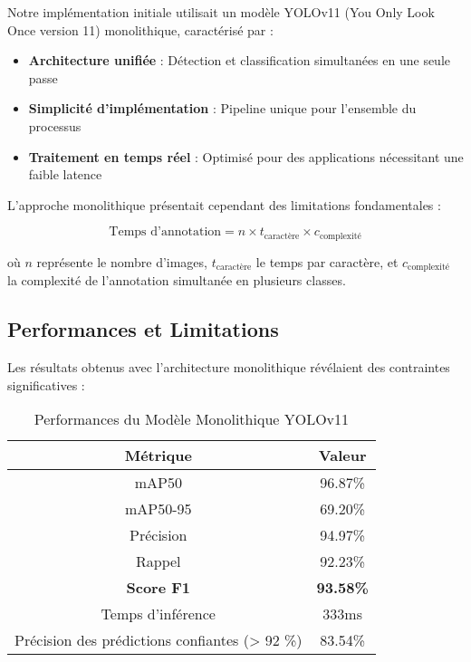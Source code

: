 \documentclass[letterpaper, 10 pt, conference]{ieeeconf}  %
\begin{document}
Notre implémentation initiale utilisait un modèle YOLOv11
(You Only Look Once version 11) monolithique, caractérisé par :

\begin{itemize}
\item \textbf{Architecture unifiée} : Détection et classification simultanées en une seule passe
\item \textbf{Simplicité d'implémentation} : Pipeline unique pour l'ensemble du processus
\item \textbf{Traitement en temps réel} : Optimisé pour des applications nécessitant une faible latence
\end{itemize}

L'approche monolithique présentait cependant des limitations fondamentales :

\begin{equation}
\text{Temps d'annotation} = n \times t_{\text{caractère}} \times c_{\text{complexité}}
\end{equation}

où $n$ représente le nombre d'images, $t_{\text{caractère}}$
le temps par caractère, et $c_{\text{complexité}}$ la complexité
de l'annotation simultanée en plusieurs classes.

\subsection{Performances et Limitations}

Les résultats obtenus avec l'architecture monolithique révélaient des contraintes significatives :

\begin{table}[h]
\caption{Performances du Modèle Monolithique YOLOv11}
\label{table_monolithique}
\begin{center}
\begin{tabular}{|c|c|}
\hline
\textbf{Métrique} & \textbf{Valeur} \\
\hline
mAP50 & 96.87\% \\
\hline
mAP50-95 & 69.20\% \\
\hline
Précision & 94.97\% \\
\hline
Rappel & 92.23\% \\
\hline
\textbf{Score F1} & \textbf{93.58\%} \\
\hline
Temps d'inférence & 333ms \\
\hline
Précision des prédictions confiantes (> 92 \%) & 83.54\% \\
\hline
\end{tabular}
\end{center}
\end{table}
\end{document}
